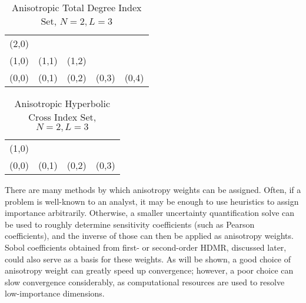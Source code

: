 \begin{table}[h]
  \centering
  \begin{tabular}{c c c c c}
    (2,0) &       &       &       & \\
    (1,0) & (1,1) & (1,2) &       & \\
    (0,0) & (0,1) & (0,2) & (0,3) & (0,4)
  \end{tabular}
  \caption{Anisotropic Total Degree Index Set, $N=2,L=3$}
  \label{tab:aniTD}
\end{table}

\begin{table}[h]
  \centering
  \begin{tabular}{c c c c}
    (1,0) &       &       &       \\
    (0,0) & (0,1) & (0,2) & (0,3)
  \end{tabular}
  \caption{Anisotropic Hyperbolic Cross Index Set, $N=2,L=3$}
  \label{tab:aniHC}
\end{table}

There are many methods by which anisotropy weights can be assigned.  Often, if a problem is well-known to an 
analyst, it may be enough to use heuristics to assign importance arbitrarily.  Otherwise, a smaller
uncertainty quantification solve can be used to roughly determine sensitivity coefficients (such as Pearson
coefficients), and the inverse of those can then be applied as anisotropy weights.  Sobol coefficients
obtained from first- or second-order HDMR, discussed later, could also serve as a basis for these weights.
As will be shown, a good choice of anisotropy weight can greatly speed up convergence; however, a
poor choice can slow convergence considerably, as computational resources are used to resolve low-importance
dimensions.


